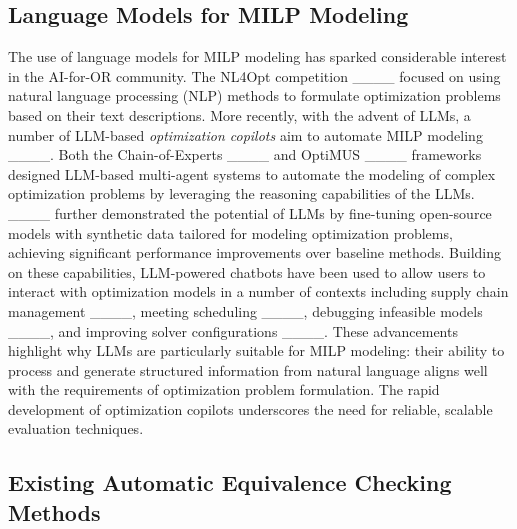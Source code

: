 \subsection{Language Models for MILP Modeling}

The use of language models for MILP modeling has sparked considerable interest in the AI-for-OR community. The NL4Opt competition ____ focused on using natural language processing (NLP) methods to formulate optimization problems based on their text descriptions. More recently, with the advent of LLMs, a number of LLM-based \emph{optimization copilots} aim to automate MILP modeling ____. %
Both the Chain-of-Experts ____ and OptiMUS ____ frameworks designed LLM-based multi-agent systems to automate the modeling of complex optimization problems by leveraging the reasoning capabilities of the LLMs.  
____ further demonstrated the potential of LLMs by fine-tuning open-source models with synthetic data tailored for modeling optimization problems, achieving significant performance improvements over baseline methods. Building on these capabilities, LLM-powered chatbots have been used to allow users to interact with optimization models in a number of contexts including supply chain management ____, meeting scheduling ____, debugging infeasible models ____, and improving solver configurations ____.
These advancements highlight why LLMs are particularly suitable for MILP modeling: their ability to process and generate structured information from natural language aligns well with the requirements of optimization problem formulation.  
The rapid development of optimization copilots underscores
the need for reliable, scalable evaluation techniques.



\subsection{Existing Automatic Equivalence Checking Methods}%

